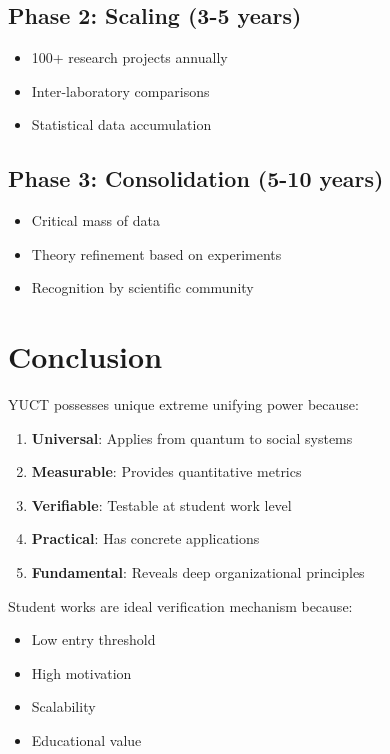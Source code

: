\documentclass[12pt,a4paper]{article}
\begin{document}
	\subsection{Phase 2: Scaling (3-5 years)}
	\begin{itemize}
		\item 100+ research projects annually
		\item Inter-laboratory comparisons
		\item Statistical data accumulation
	\end{itemize}
	
	\subsection{Phase 3: Consolidation (5-10 years)}
	\begin{itemize}
		\item Critical mass of data
		\item Theory refinement based on experiments
		\item Recognition by scientific community
	\end{itemize}
	
	\section{Conclusion}
	
	YUCT possesses unique extreme unifying power because:
	\begin{enumerate}
		\item \textbf{Universal}: Applies from quantum to social systems
		\item \textbf{Measurable}: Provides quantitative metrics
		\item \textbf{Verifiable}: Testable at student work level
		\item \textbf{Practical}: Has concrete applications
		\item \textbf{Fundamental}: Reveals deep organizational principles
	\end{enumerate}
	
	Student works are ideal verification mechanism because:
	\begin{itemize}
		\item Low entry threshold
		\item High motivation
		\item Scalability
		\item Educational value
	\end{itemize}
	
\end{document}

